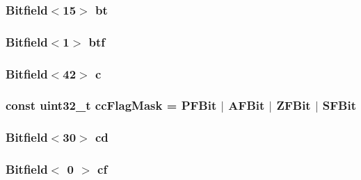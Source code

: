 \label{namespaceX86ISA_af18c00627819c09b6425eb397d13a11f}
\hypertarget{namespaceX86ISA_a426099f57666b3d095c8e32f9f43d415}{
\subsubsection[{bt}]{\setlength{\rightskip}{0pt plus 5cm}Bitfield$<$15$>$ {\bf bt}}}
\label{namespaceX86ISA_a426099f57666b3d095c8e32f9f43d415}
\hypertarget{namespaceX86ISA_aa3493c5a55b04a5f031fcee4d5a5ff1c}{
\subsubsection[{btf}]{\setlength{\rightskip}{0pt plus 5cm}Bitfield$<$1$>$ {\bf btf}}}
\label{namespaceX86ISA_aa3493c5a55b04a5f031fcee4d5a5ff1c}
\hypertarget{namespaceX86ISA_ad4568b476d67559c215a39c30cb3cb51}{
\subsubsection[{c}]{\setlength{\rightskip}{0pt plus 5cm}Bitfield$<$42$>$ {\bf c}}}
\label{namespaceX86ISA_ad4568b476d67559c215a39c30cb3cb51}
\hypertarget{namespaceX86ISA_ace12242afd3bc8679daac79ae1338404}{
\subsubsection[{ccFlagMask}]{\setlength{\rightskip}{0pt plus 5cm}const {\bf uint32\_\-t} {\bf ccFlagMask} = PFBit $|$ AFBit $|$ ZFBit $|$ SFBit}}
\label{namespaceX86ISA_ace12242afd3bc8679daac79ae1338404}
\hypertarget{namespaceX86ISA_ab0ba74813c0fab204c3806bbe932ff11}{
\subsubsection[{cd}]{\setlength{\rightskip}{0pt plus 5cm}Bitfield$<$30$>$ {\bf cd}}}
\label{namespaceX86ISA_ab0ba74813c0fab204c3806bbe932ff11}
\hypertarget{namespaceX86ISA_a7f54733f0476aea15d4f3590bbe0ce63}{
\subsubsection[{cf}]{\setlength{\rightskip}{0pt plus 5cm}Bitfield$<$ 0 $>$ {\bf cf}}}
